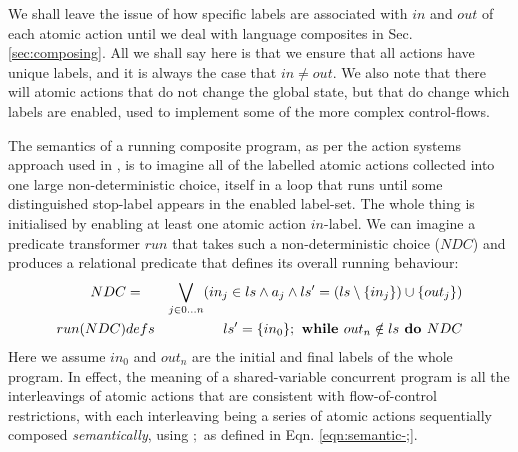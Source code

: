 We shall leave the issue of how specific labels
are associated with $in$ and $out$ of each atomic action until we
deal with language composites in Sec. \ref{sec:composing}.
All we shall say here is that we ensure that all actions have unique labels,
and it is always the case that $in \neq out$.
We also note that there will atomic actions that do not change the global
state, but that do change which labels are enabled, used to implement
some of the more complex control-flows.

The semantics of a running composite program,
as per the action systems approach used in \cite{DBLP:conf/icfem/WoodcockH02},
is to imagine all of the labelled atomic actions collected into one large
non-deterministic choice,
itself in a loop that runs until some distinguished stop-label appears
in the enabled label-set. The whole thing is initialised by enabling
at least one atomic action $in$-label.
We can imagine a predicate transformer $run$
that takes such a non-deterministic choice ($NDC$) and produces
a relational predicate that defines its overall running behaviour:
\begin{eqnarray}
   NDC
   &=&
   \bigvee_{j \in 0\dots n} (in_j \in ls
   \land
   a_j
   \land
   ls'=(ls\setminus\{{in_j}\})\cup\{{out_j}\})
\\ run(NDC)
   &defs&
   ls' = \{{in_0}\} ; \textbf{ while } out_n \notin ls \textbf{ do } NDC
\end{eqnarray}
Here we assume $in_0$ and $out_n$ are the initial and final labels of the whole
program.
In effect, the meaning of a shared-variable concurrent program
is all the interleavings of atomic actions that are consistent
with flow-of-control restrictions, with each interleaving
being a series of atomic actions sequentially composed \emph{semantically},
using $;$ as defined in Eqn. \ref{eqn:semantic-;}.

